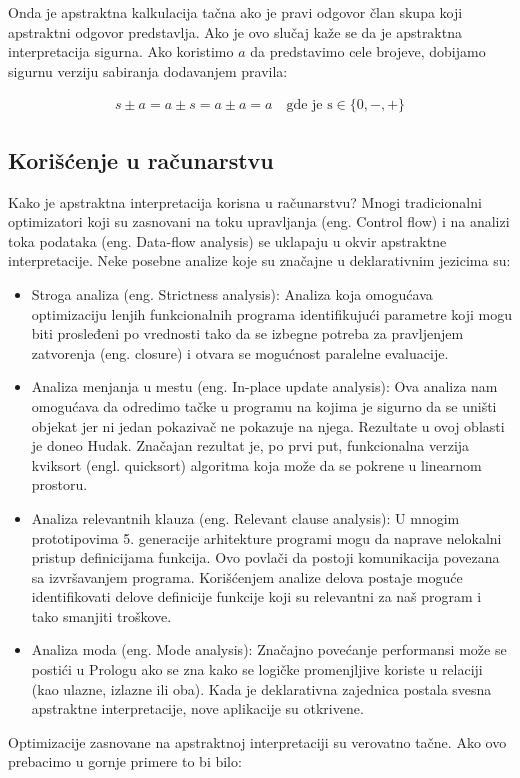 Onda je apstraktna kalkulacija tačna ako je pravi odgovor član skupa koji apstraktni odgovor predstavlja. Ako je ovo slučaj kaže se da je apstraktna interpretacija sigurna. Ako koristimo $a$ da predstavimo cele brojeve, dobijamo sigurnu verziju sabiranja dodavanjem pravila:

\begin{multline}	
	s \pm a = a \pm s = a \pm a = a \quad \text{gde je s} \in \{0, -, +\}
\end{multline}
\cite{AbramskyHankin}

\subsection{Korišćenje u računarstvu}
\label{subsec:problem1}
Kako je apstraktna interpretacija korisna u računarstvu? Mnogi tradicionalni optimizatori koji su zasnovani na toku upravljanja (eng. Control flow) i na analizi toka podataka (eng. Data-flow analysis) se uklapaju u okvir apstraktne interpretacije. Neke posebne analize koje su značajne u deklarativnim jezicima su:

\begin{itemize}
\item Stroga analiza (eng. Strictness analysis):
Analiza koja omogućava optimizaciju lenjih  funkcionalnih programa identifikujući parametre koji mogu biti prosleđeni po vrednosti tako da se izbegne potreba za pravljenjem zatvorenja (eng. closure) i otvara se mogućnost paralelne evaluacije. 

\item Analiza menjanja u mestu (eng. In-place update analysis):
Ova analiza nam omogućava da odredimo tačke u programu na kojima je sigurno da se uništi objekat jer ni jedan pokazivač ne pokazuje na njega. Rezultate u ovoj oblasti je doneo Hudak. Značajan rezultat je, po prvi put, funkcionalna verzija kviksort (engl. quicksort) algoritma koja može da se pokrene u linearnom prostoru. \cite{Girard1987}

\item Analiza relevantnih klauza (eng. Relevant clause analysis):
U mnogim prototipovima 5. generacije arhitekture programi mogu da naprave nelokalni pristup definicijama funkcija. Ovo povlači da postoji komunikacija povezana sa izvršavanjem programa. Korišćenjem analize delova postaje moguće identifikovati delove definicije funkcije koji su relevantni za naš program i tako smanjiti troškove.  

\item Analiza moda (eng. Mode analysis):
Značajno povećanje performansi može se postići u Prologu ako se zna kako se logičke promenjljive koriste u relaciji (kao ulazne, izlazne ili oba).
Kada je deklarativna zajednica postala svesna apstraktne interpretacije, nove aplikacije su otkrivene. 

\end{itemize}
Optimizacije zasnovane na apstraktnoj interpretaciji su verovatno tačne. Ako ovo prebacimo u gornje primere to bi bilo:

